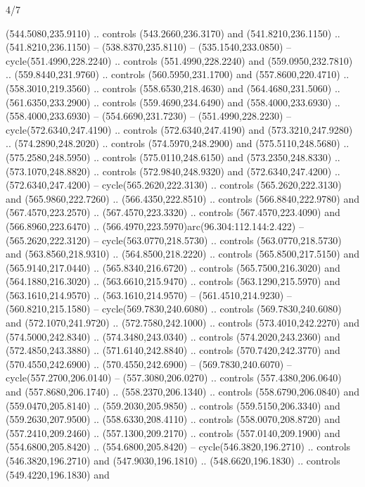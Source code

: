 \begin{flagdescription}{4/7}
\begin{scope}[shift={(0.5\flaglength,0.5\flagwidth)},scale=\flagwidth*\stretchfactor/820]
\begin{scope}[scale=1.87,xshift=-138mm,yshift=75mm]
\begin{scope}[y=0.8pt, x=0.8pt, yscale=-1, xscale=1]
\begin{scope}[fill=cd2a567]
  (544.5080,235.9110) .. controls (543.2660,236.3170) and (541.8210,236.1150) ..
  (541.8210,236.1150) -- (538.8370,235.8110) -- (535.1540,233.0850) --
  cycle(551.4990,228.2240) .. controls (551.4990,228.2240) and
  (559.0950,232.7810) .. (559.8440,231.9760) .. controls (560.5950,231.1700) and
  (557.8600,220.4710) .. (558.3010,219.3560) .. controls (558.6530,218.4630) and
  (564.4680,231.5060) .. (561.6350,233.2900) .. controls (559.4690,234.6490) and
  (558.4000,233.6930) .. (558.4000,233.6930) -- (554.6690,231.7230) --
  (551.4990,228.2230) -- cycle(572.6340,247.4190) .. controls
  (572.6340,247.4190) and (573.3210,247.9280) .. (574.2890,248.2020) .. controls
  (574.5970,248.2900) and (575.5110,248.5680) .. (575.2580,248.5950) .. controls
  (575.0110,248.6150) and (573.2350,248.8330) .. (573.1070,248.8820) .. controls
  (572.9840,248.9320) and (572.6340,247.4200) .. (572.6340,247.4200) --
  cycle(565.2620,222.3130) .. controls (565.2620,222.3130) and
  (565.9860,222.7260) .. (566.4350,222.8510) .. controls (566.8840,222.9780) and
  (567.4570,223.2570) .. (567.4570,223.3320) .. controls (567.4570,223.4090) and
  (566.8960,223.6470) .. (566.4970,223.5970)arc(96.304:112.144:2.422) --
  (565.2620,222.3120) -- cycle(563.0770,218.5730) .. controls
  (563.0770,218.5730) and (563.8560,218.9310) .. (564.8500,218.2220) .. controls
  (565.8500,217.5150) and (565.9140,217.0440) .. (565.8340,216.6720) .. controls
  (565.7500,216.3020) and (564.1880,216.3020) .. (563.6610,215.9470) .. controls
  (563.1290,215.5970) and (563.1610,214.9570) .. (563.1610,214.9570) --
  (561.4510,214.9230) -- (560.8210,215.1580) -- cycle(569.7830,240.6080) ..
  controls (569.7830,240.6080) and (572.1070,241.9720) .. (572.7580,242.1000) ..
  controls (573.4010,242.2270) and (574.5000,242.8340) .. (574.3480,243.0340) ..
  controls (574.2020,243.2360) and (572.4850,243.3880) .. (571.6140,242.8840) ..
  controls (570.7420,242.3770) and (570.4550,242.6900) .. (570.4550,242.6900) --
  (569.7830,240.6070) -- cycle(557.2700,206.0140) -- (557.3080,206.0270) ..
  controls (557.4380,206.0640) and (557.8680,206.1740) .. (558.2370,206.1340) ..
  controls (558.6790,206.0840) and (559.0470,205.8140) .. (559.2030,205.9850) ..
  controls (559.5150,206.3340) and (559.2630,207.9500) .. (558.6330,208.4110) ..
  controls (558.0070,208.8720) and (557.2410,209.2460) .. (557.1300,209.2170) ..
  controls (557.0140,209.1900) and (554.6800,205.8420) .. (554.6800,205.8420) --
  cycle(546.3820,196.2710) .. controls (546.3820,196.2710) and
  (547.9030,196.1810) .. (548.6620,196.1830) .. controls (549.4220,196.1830) and

\end{scope}
\end{scope}
\end{scope}
\end{scope}
\end{flagdescription}
